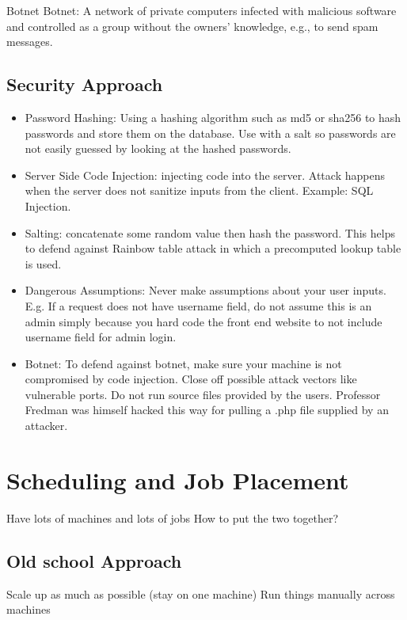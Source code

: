 \documentclass[fancy,11pt,titlestyle=display]{style/elegantbook}
\begin{document}
\begin{definition}{Botnet}{}
Botnet: A network of private computers infected with malicious software and controlled as a group without the owners' knowledge, e.g., to send spam messages.
\end{definition}

\section{Security Approach}
\begin{itemize}
    \item Password Hashing: Using a hashing algorithm such as md5 or sha256 to hash passwords and store them on the database. Use with a salt so passwords are not easily guessed by looking at the hashed passwords.
    \item Server Side Code Injection: injecting code into the server. Attack happens when the server does not sanitize inputs from the client. Example: SQL Injection.
    \item Salting: concatenate some random value then hash the password. This helps to defend against Rainbow table attack in which a precomputed lookup table is used.
    \item Dangerous Assumptions: Never make assumptions about your user inputs. E.g. If a request does not have username field, do not assume this is an admin simply because you hard code the front end website to not include username field for admin login. 
    \item Botnet: To defend against botnet, make sure your machine is not compromised by code injection. Close off possible attack vectors like vulnerable ports. Do not run source files provided by the users. Professor Fredman was himself hacked this way for pulling a .php file supplied by an attacker.
\end{itemize}

\chapter{Scheduling and Job Placement}

Have lots of machines and lots of jobs
How to put the two together?
\section{Old school Approach}

Scale up as much as possible (stay on one machine)
Run things manually across machines
\end{document}
